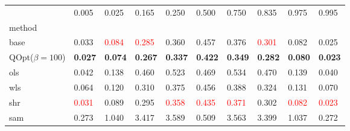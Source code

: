 \begin{tabular}{llllllllll}
\toprule
 & 0.005 & 0.025 & 0.165 & 0.250 & 0.500 & 0.750 & 0.835 & 0.975 & 0.995 \\
method &  &  &  &  &  &  &  &  &  \\
\midrule
base & 0.033 & \textcolor{red}{0.084} & \textcolor{red}{0.285} & 0.360 & 0.457 & 0.376 & \textcolor{red}{0.301} & 0.082 & 0.025 \\
\midrule
QOpt($\beta=100$) & \textbf{0.027} & \textbf{0.074} & \textbf{0.267} & \textbf{0.337} & \textbf{0.422} & \textbf{0.349} & \textbf{0.282} & \textbf{0.080} & \textbf{0.023} \\
ols & 0.042 & 0.138 & 0.460 & 0.523 & 0.469 & 0.534 & 0.470 & 0.139 & 0.040 \\
wls & 0.064 & 0.120 & 0.310 & 0.375 & 0.456 & 0.388 & 0.324 & 0.131 & 0.070 \\
shr & \textcolor{red}{0.031} & 0.089 & 0.295 & \textcolor{red}{0.358} & \textcolor{red}{0.435} & \textcolor{red}{0.371} & 0.302 & \textcolor{red}{0.082} & \textcolor{red}{0.023} \\
sam & 0.273 & 1.040 & 3.417 & 3.589 & 0.509 & 3.563 & 3.399 & 1.037 & 0.272 \\
\bottomrule
\end{tabular}